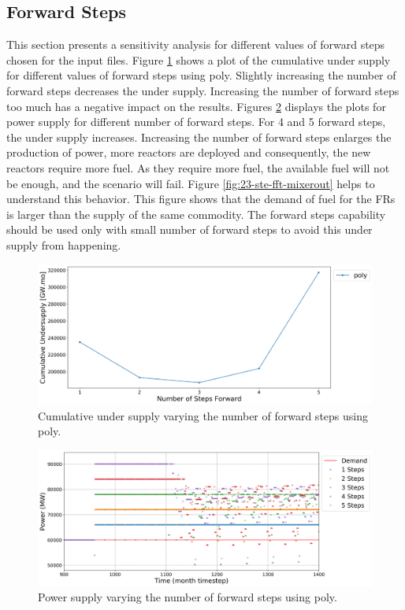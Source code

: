 \documentclass[11pt]{article}
\begin{document}
\subsection{Forward Steps}

This section presents a sensitivity analysis for different values of forward steps chosen for the input files.
Figure \ref{fig:23-steps} shows a plot of the cumulative under supply for different values of forward steps using poly.
Slightly increasing the number of forward steps decreases the under supply. Increasing the number of forward steps too much has a negative impact on the results.
Figures \ref{fig:23-ste-poly} displays the plots for power supply for different number of forward steps. For 4 and 5 forward steps, the under supply increases.
Increasing the number of forward steps enlarges the production of power, more reactors are deployed and consequently, the new reactors require more fuel. As they require more fuel, the available fuel will not be enough, and the scenario will fail. Figure \ref{fig:23-ste-fft-mixerout} helps to understand this behavior. This figure shows that the demand of fuel for the FRs is larger than the supply of the same commodity.
The forward steps capability should be used only with small number of forward steps to avoid this under supply from happening.

\begin{figure}[H]
	\centering
	\includegraphics[width=\textwidth]{23-figures/23-sens-steps.png} 
	\hfill
	\caption{Cumulative under supply varying the number of forward steps using poly.}
	\label{fig:23-steps}
\end{figure}

\begin{figure}[H]
	\centering
	\includegraphics[width=\textwidth]{23-figures/23-power-buffer0-poly-steps.png} 
	\hfill
	\caption{Power supply varying the number of forward steps using poly.}
	\label{fig:23-ste-poly}
\end{figure}
\end{document}

